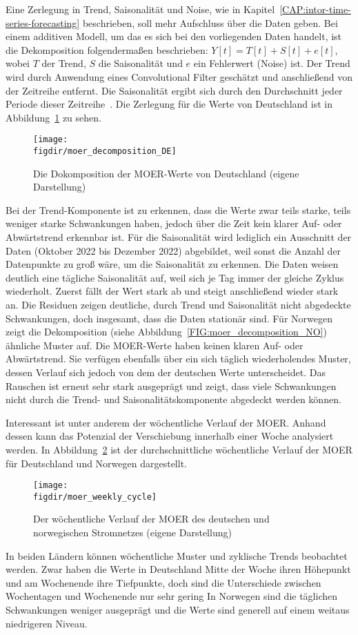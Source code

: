 Eine Zerlegung in Trend, Saisonalität und Noise, wie in Kapitel~\ref{CAP:intor-time-series-forecasting} beschrieben, soll mehr Aufschluss über die Daten geben.
Bei einem additiven Modell, um das es sich bei den vorliegenden Daten handelt, ist die Dekomposition folgendermaßen beschrieben:
$Y[t] = T[t] + S[t] + e[t]$, wobei $T$ der Trend, $S$ die Saisonalität und $e$ ein Fehlerwert (Noise) ist.
Der Trend wird durch Anwendung eines Convolutional Filter geschätzt und anschließend von der Zeitreihe entfernt.
Die Saisonalität ergibt sich durch den Durchschnitt jeder Periode dieser Zeitreihe~\cite{JosefPerktold.2023}.
Die Zerlegung für die Werte von Deutschland ist in Abbildung~\ref{FIG:moer_decomposition_DE} zu sehen.
\begin{figure}
 \caption{Die Dokomposition der MOER-Werte von Deutschland (eigene Darstellung)}
 {\texttt{[image: \\figdir/moer\_decomposition\_DE]}}
 \label{FIG:moer_decomposition_DE}
\end{figure}
Bei der Trend-Komponente ist zu erkennen, dass die Werte zwar teils starke, teils weniger starke Schwankungen haben, jedoch über die Zeit kein klarer Auf- oder Abwärtstrend erkennbar ist.
Für die Saisonalität wird lediglich ein Ausschnitt der Daten (Oktober 2022 bis Dezember 2022) abgebildet, weil sonst die Anzahl der Datenpunkte zu groß wäre, um die Saisonalität zu erkennen.
Die Daten weisen deutlich eine tägliche Saisonalität auf, weil sich je Tag immer der gleiche Zyklus wiederholt.
Zuerst fällt der Wert stark ab und steigt anschließend wieder stark an.
Die Residuen zeigen deutliche, durch Trend und Saisonalität nicht abgedeckte Schwankungen, doch insgesamt, dass die Daten stationär sind.
Für Norwegen zeigt die Dekomposition (siehe Abbildung~\ref{FIG:moer_decomposition_NO}) ähnliche Muster auf.
Die \ac{MOER}-Werte haben keinen klaren Auf- oder Abwärtstrend.
Sie verfügen ebenfalls über ein sich täglich wiederholendes Muster, dessen Verlauf sich jedoch von dem der deutschen Werte unterscheidet.
Das Rauschen ist erneut sehr stark ausgeprägt und zeigt, dass viele Schwankungen nicht durch die Trend- und Saisonalitätskomponente abgedeckt werden können.

Interessant ist unter anderem der wöchentliche Verlauf der \ac{MOER}.
Anhand dessen kann das Potenzial der Verschiebung innerhalb einer Woche analysiert werden.
In Abbildung~\ref{FIG:moer_weekly_cycle} ist der durchschnittliche wöchentliche Verlauf der \ac{MOER} für Deutschland und Norwegen dargestellt.
\begin{figure}
 \caption{Der wöchentliche Verlauf der MOER des deutschen und norwegischen Stromnetzes (eigene Darstellung)}
 {\texttt{[image: \\figdir/moer\_weekly\_cycle]}}
 \label{FIG:moer_weekly_cycle}
\end{figure}
In beiden Ländern können wöchentliche Muster und zyklische Trends beobachtet werden.
Zwar haben die Werte in Deutschland Mitte der Woche ihren Höhepunkt und am Wochenende ihre Tiefpunkte, doch sind die Unterschiede zwischen Wochentagen und Wochenende nur sehr gering
In Norwegen sind die täglichen Schwankungen weniger ausgeprägt und die Werte sind generell auf einem weitaus niedrigeren Niveau.

